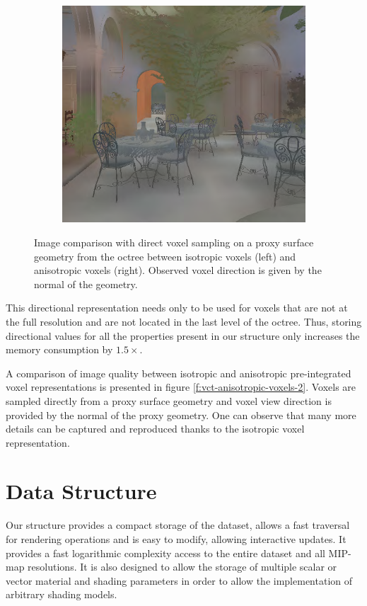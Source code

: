 \begin{figure}
\begin{subfigure}[b]{0.5\textwidth}
		\includegraphics{graphics/vct/vct-12-2}
	\end{subfigure}
	\caption{Image comparison with direct voxel sampling on a proxy surface geometry from the octree between isotropic voxels (left) and anisotropic voxels (right). Observed voxel direction is given by the normal of the geometry.}
\end{figure}

This directional representation needs only to be used for voxels that are not at the full resolution and are not located in the last level of the octree. Thus, storing directional values for all the properties present in our structure only increases the memory consumption by $1.5\times$.

A comparison of image quality between isotropic and anisotropic pre-integrated voxel representations is presented in figure \ref{f:vct-anisotropic-voxels-2}. Voxels are sampled directly from a proxy surface geometry and voxel view direction is provided by the normal of the proxy geometry. One can observe that many more details can be captured and reproduced thanks to the isotropic voxel representation.





\section{Data Structure}
Our structure provides a compact storage of the dataset, allows a fast traversal for rendering operations and is easy to modify, allowing interactive updates. It provides a fast logarithmic complexity access to the entire dataset and all MIP-map resolutions. It is also designed to allow the storage of multiple scalar or vector material and shading parameters in order to allow the implementation of arbitrary shading models. 



